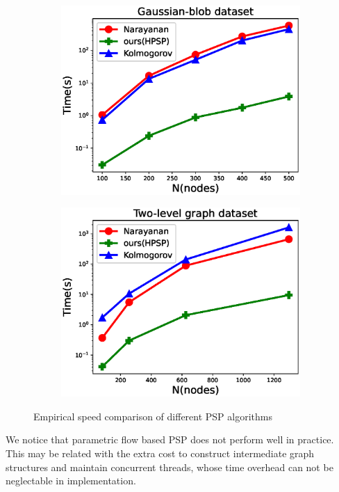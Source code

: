 \begin{figure}
	\centering
	\begin{subfigure}{0.45\textwidth}
		\includegraphics[width=\textwidth]{pic/2019-08-26-gaussian.eps}
	\end{subfigure}
	\begin{subfigure}{0.45\textwidth}
		\includegraphics[width=\textwidth]{pic/2019-09-19-two_level.eps}
	\end{subfigure}
	\caption{Empirical speed comparison of different PSP algorithms}\label{fig:esc}
\end{figure}

We notice that parametric flow based PSP \citep{kolmogorov}  does not perform well in practice. This may be related with the extra cost to construct intermediate graph structures and maintain concurrent threads, whose time overhead can not be neglectable in implementation.


